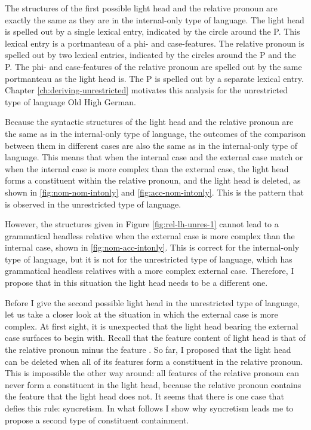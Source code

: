 The structures of the first possible light head and the relative pronoun are exactly the same as they are in the internal-only type of language.
The light head is spelled out by a single lexical entry, indicated by the circle around the P. This lexical entry is a portmanteau of a phi- and case-features.
The relative pronoun is spelled out by two lexical entries, indicated by the circles around the P and the P. The phi- and case-features of the relative pronoun are spelled out by the same portmanteau as the light head is. The P is spelled out by a separate lexical entry. Chapter \ref{ch:deriving-unrestricted} motivates this analysis for the unrestricted type of language Old High German.

Because the syntactic structures of the light head and the relative pronoun are the same as in the internal-only type of language, the outcomes of the comparison between them in different cases are also the same as in the internal-only type of language. This means that when the internal case and the external case match or when the internal case is more complex than the external case, the light head forms a constituent within the relative pronoun, and the light head is deleted, as shown in \ref{fig:nom-nom-intonly} and \ref{fig:acc-nom-intonly}. This is the pattern that is observed in the unrestricted type of language.

However, the structures given in Figure \ref{fig:rel-lh-unres-1} cannot lead to a grammatical headless relative when the external case is more complex than the internal case, shown in \ref{fig:nom-acc-intonly}. This is correct for the internal-only type of language, but it is not for the unrestricted type of language, which has grammatical headless relatives with a more complex external case. Therefore, I propose that in this situation the light head needs to be a different one.

Before I give the second possible light head in the unrestricted type of language, let us take a closer look at the situation in which the external case is more complex. At first sight, it is unexpected that the light head bearing the external case surfaces to begin with. Recall that the feature content of light head is that of the relative pronoun minus the feature . So far, I proposed that the light head can be deleted when all of its features form a constituent in the relative pronoun. This is impossible the other way around: all features of the relative pronoun can never form a constituent in the light head, because the relative pronoun contains the feature  that the light head does not. It seems that there is one case that defies this rule: syncretism. In what follows I show why syncretism leads me to propose a second type of constituent containment.

